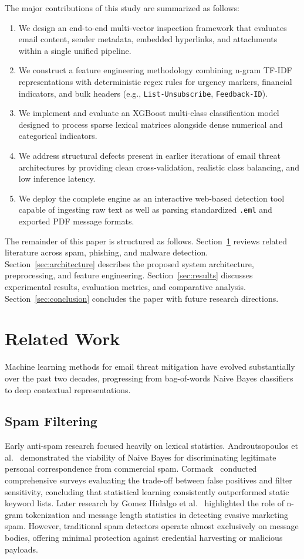 \documentclass[conference]{IEEEtran}
\begin{document}
The major contributions of this study are summarized as follows:
\begin{enumerate}
    \item We design an end-to-end multi-vector inspection framework that evaluates email content, sender metadata, embedded hyperlinks, and attachments within a single unified pipeline.
    \item We construct a feature engineering methodology combining n-gram TF-IDF representations with deterministic regex rules for urgency markers, financial indicators, and bulk headers (e.g., \texttt{List-Unsubscribe}, \texttt{Feedback-ID}).
    \item We implement and evaluate an XGBoost multi-class classification model designed to process sparse lexical matrices alongside dense numerical and categorical indicators.
    \item We address structural defects present in earlier iterations of email threat architectures by providing clean cross-validation, realistic class balancing, and low inference latency.
    \item We deploy the complete engine as an interactive web-based detection tool capable of ingesting raw text as well as parsing standardized \texttt{.eml} and exported PDF message formats.
\end{enumerate}

The remainder of this paper is structured as follows. Section~\ref{sec:related} reviews related literature across spam, phishing, and malware detection. Section~\ref{sec:architecture} describes the proposed system architecture, preprocessing, and feature engineering. Section~\ref{sec:results} discusses experimental results, evaluation metrics, and comparative analysis. Section~\ref{sec:conclusion} concludes the paper with future research directions.

\section{Related Work}
\label{sec:related}
Machine learning methods for email threat mitigation have evolved substantially over the past two decades, progressing from bag-of-words Naive Bayes classifiers to deep contextual representations.

\subsection{Spam Filtering}
Early anti-spam research focused heavily on lexical statistics. Androutsopoulos et al.~\cite{b1} demonstrated the viability of Naive Bayes for discriminating legitimate personal correspondence from commercial spam. Cormack~\cite{b2} conducted comprehensive surveys evaluating the trade-off between false positives and filter sensitivity, concluding that statistical learning consistently outperformed static keyword lists. Later research by Gomez Hidalgo et al.~\cite{b3} highlighted the role of n-gram tokenization and message length statistics in detecting evasive marketing spam. However, traditional spam detectors operate almost exclusively on message bodies, offering minimal protection against credential harvesting or malicious payloads.
\end{document}
